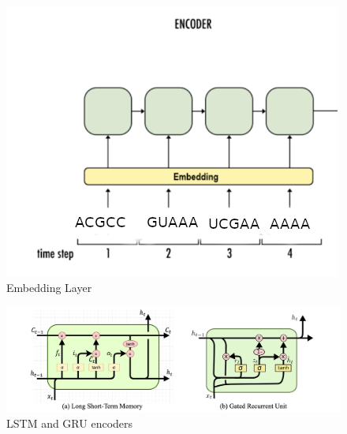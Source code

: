 \documentclass[conference]{IEEEtran}
\begin{document}
\begin{figure}
	\centering
	\includegraphics[width=0.8\columnwidth]{imgs/encoder.PNG}
	\caption{Embedding Layer}
	\label{fig:encoder}
\end{figure}


\begin{figure}
	\centering
	\includegraphics[width=1\columnwidth]{imgs/lstm_and_gru.PNG}
	\caption{LSTM and GRU encoders}
	\label{fig:lstm_gru}
\end{figure}
\end{document}
